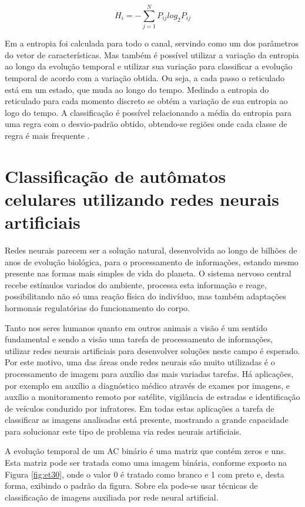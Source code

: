 \documentclass[12pt,a4paper]{report}
\begin{document}
	\begin{equation}
	H_i=-\sum_{j=1}^{N}P_{ij}log_2 P_{ij}
	\label{eq:entropyCorImag}
	\end{equation}
	
	Em  a entropia foi calculada para todo o canal, servindo como um dos parâmetros do vetor de características. Mas também é possível utilizar a variação da entropia ao longo da evolução temporal e utilizar sua variação para classificar a evolução temporal de acordo com a variação obtida. Ou seja, a cada passo o reticulado está em um estado, que muda ao longo do tempo. Medindo a entropia do reticulado para cada momento discreto se obtém a variação de sua entropia ao logo do tempo. A classificação é possível relacionando a média da entropia para uma regra com o desvio-padrão obtido, obtendo-se regiões onde cada classe de regra é mais frequente \cite{Andrew1998}. 
	
	
	\chapter{Classificação de autômatos celulares utilizando redes neurais artificiais}
	\label{cap:classACUsingNetwork}
	
	Redes neurais parecem ser a solução natural, desenvolvida ao longo de bilhões de anos de evolução biológica, para o processamento de informações, estando mesmo presente nas formas mais simples de vida do planeta. O sistema nervoso central recebe estímulos variados do ambiente, processa esta informação e reage, possibilitando não só uma reação física do indivíduo, mas também adaptações hormonais regulatórias do funcionamento do corpo.
	
	Tanto nos seres humanos quanto em outros animais a visão é um sentido fundamental e sendo a visão uma tarefa de processamento de informações, utilizar redes neurais artificiais para desenvolver soluções neste campo é esperado. Por este motivo, uma das áreas onde redes neurais são muito utilizadas é o processamento de imagem para auxílio das mais variadas tarefas. Há aplicações, por exemplo em auxílio a diagnóstico médico através de exames por imagens, e  auxílio a monitoramento remoto por satélite, vigilância de estradas e identificação de veículos conduzido por infratores. Em todas estas aplicações a tarefa de classificar as imagens analisadas está presente, mostrando a grande capacidade para solucionar este tipo de problema via redes neurais artificiais.
	
	A evolução temporal de um AC binário é uma matriz que contém zeros e uns. Esta matriz pode ser tratada como uma imagem binária, conforme exposto na Figura \ref{fig:et30}, onde o valor 0 é tratado como branco e 1 com preto e, desta forma, exibindo o padrão da figura. Sobre ela pode-se usar técnicas de classificação de imagens auxiliada por rede neural artificial.
	
\end{document}
